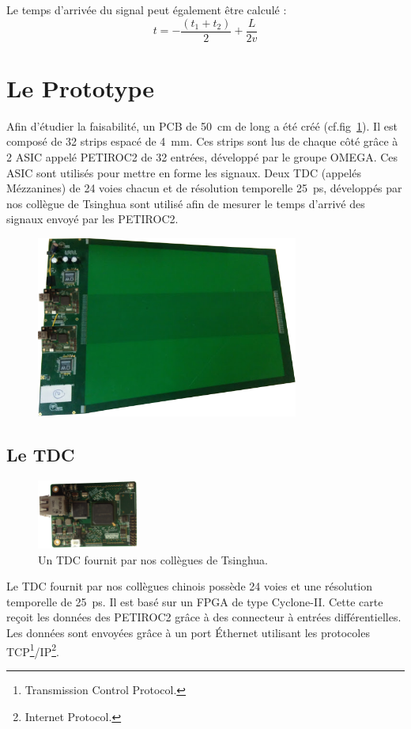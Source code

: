 Le temps d'arrivée du signal peut également être calculé :
\begin{equation}
\label{myformule}
t=-\frac{(t_1+t_2)}{2}+\frac{L}{2v}
\end{equation}

\section{Le Prototype}
Afin d'étudier la faisabilité, un PCB de \SI{50}{\centi\meter} de long a été créé (cf.fig~\ref{PCB2}). Il est composé de \num{32} strips espacé de \SI{4}{\milli\meter}. Ces strips sont lus de chaque côté grâce à \num{2} ASIC appelé PETIROC2 \cite{Monzo:2017quz} de \num{32} entrées, développé par le groupe OMEGA. Ces ASIC sont utilisés pour mettre en forme les signaux. Deux TDC (appelés Mézzanines) de \num{24} voies chacun et de résolution temporelle \SI{25}{\pico\second}, développés par nos collègue de Tsinghua sont utilisé afin de mesurer le temps d'arrivé des signaux envoyé par les PETIROC2.

\begin{figure}[ht!]
	\centering
	\includegraphics[width=0.77\textwidth]{ELE/PCB2.png}
	\label{PCB2}
\end{figure}

\subsection{Le TDC}
\begin{figure}
	\vspace*{-1cm}
	\centering
	\includegraphics[width=0.30\textwidth]{ELE/TDC.png}
	\caption{Un TDC fournit par nos collègues de Tsinghua.}
	\label{tdc}
\end{figure}
Le TDC fournit par nos collègues chinois possède \num{24} voies et une résolution temporelle de \SI{25}{\pico\second}. Il est basé sur un FPGA de type Cyclone-II. Cette carte reçoit les données des PETIROC2 grâce à des connecteur à entrées différentielles. Les données sont envoyées grâce à un port Éthernet utilisant les protocoles TCP\footnote{Transmission Control Protocol.}/IP\footnote{Internet Protocol.}.

